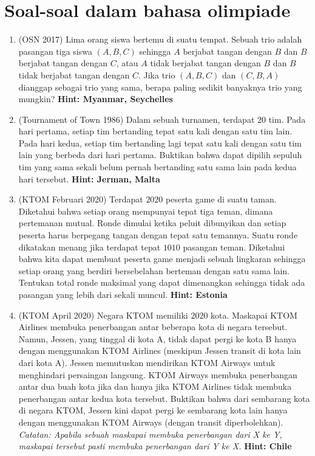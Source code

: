 \documentclass[11pt]{scrartcl}
\begin{document}
\section{Soal-soal dalam bahasa olimpiade}
\begin{enumerate}
    \item (OSN 2017) Lima orang siswa bertemu di suatu tempat. Sebuah trio adalah pasangan tiga siswa $(A,B,C)$ sehingga $A$ berjabat tangan dengan $B$ dan $B$ berjabat tangan dengan $C$, atau $A$ tidak berjabat tangan dengan $B$ dan $B$ tidak berjabat tangan dengan $C$. Jika trio $(A,B,C)$ dan $(C,B,A)$ dianggap sebagai trio yang sama, berapa paling sedikit banyaknya trio yang mungkin? \textbf{Hint: Myanmar, Seychelles}
    \item (Tournament of Town 1986) Dalam sebuah turnamen, terdapat $20$ tim. Pada hari pertama, setiap tim bertanding tepat satu kali dengan satu tim lain. Pada hari kedua, setiap tim bertanding lagi tepat satu kali dengan satu tim lain yang berbeda dari hari pertama. Buktikan bahwa dapat dipilih sepuluh tim yang sama sekali belum pernah bertanding satu sama lain pada kedua hari tersebut. \textbf{Hint: Jerman, Malta}
    \item (KTOM Februari 2020) Terdapat $2020$ peserta game di suatu taman. Diketahui bahwa setiap orang mempunyai tepat tiga teman, dimana pertemanan mutual. Ronde dimulai ketika peluit dibunyikan dan setiap peserta harus berpegang tangan dengan tepat satu temannya. Suatu ronde dikatakan menang jika terdapat tepat $1010$ pasangan teman. Diketahui bahwa kita dapat membuat peserta game menjadi sebuah lingkaran sehingga setiap orang yang berdiri bersebelahan berteman dengan satu sama lain. Tentukan total ronde maksimal yang dapat dimenangkan sehingga tidak ada pasangan yang lebih dari sekali muncul. \textbf{Hint: Estonia}
    \item (KTOM April 2020) Negara KTOM memiliki $2020$ kota. Maskapai KTOM Airlines membuka penerbangan antar beberapa kota di negara tersebut. Namun, Jessen, yang tinggal di kota A, tidak dapat pergi ke kota B hanya dengan menggunakan KTOM Airlines (meskipun Jessen transit di kota lain dari kota A). Jessen memutuskan mendirikan KTOM Airways untuk menghindari persaingan langsung. KTOM Airways membuka penerbangan antar dua buah kota jika dan hanya jika KTOM Airlines tidak membuka penerbangan antar kedua kota tersebut. Buktikan bahwa dari sembarang kota di negara KTOM, Jessen kini dapat pergi ke sembarang kota lain hanya dengan menggunakan KTOM Airways (dengan transit diperbolehkan). \textit{Catatan: Apabila sebuah maskapai membuka penerbangan dari X ke Y, maskapai tersebut pasti membuka penerbangan dari Y ke  X.} \textbf{Hint: Chile}

\end{enumerate}
\end{document}
